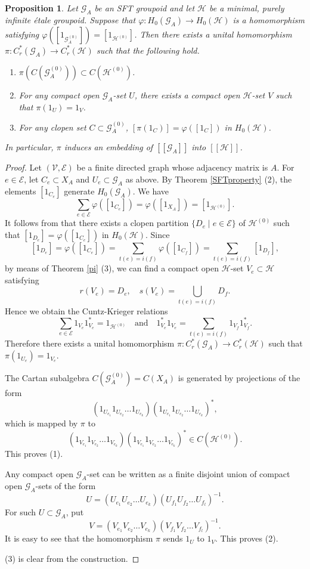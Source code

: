 \documentclass[11pt]{article}
\newtheorem{proposition}[theorem]{Proposition}
\theoremstyle{definition}
\numberwithin{equation}{section}
\renewcommand{\phi}{\varphi}
\newcommand{\G}{\mathcal{G}}
\renewcommand{\H}{\mathcal{H}}
\begin{document}
\begin{proposition}
Let $\G_A$ be an SFT groupoid and 
let $\H$ be a minimal, purely infinite \'etale groupoid. 
Suppose that $\phi:H_0(\G_A)\to H_0(\H)$ is a homomorphism 
satisfying $\phi([1_{\G_A^{(0)}}])=[1_{\H^{(0)}}]$. 
Then there exists a unital homomorphism 
$\pi:C^*_r(\G_A)\to C^*_r(\H)$ such that the following hold. 
\begin{enumerate}
\item $\pi(C(\G_A^{(0)}))\subset C(\H^{(0)})$. 
\item For any compact open $\G_A$-set $U$, 
there exists a compact open $\H$-set $V$ 
such that $\pi(1_U)=1_V$. 
\item For any clopen set $C\subset\G_A^{(0)}$, 
$[\pi(1_C)]=\phi([1_C])$ in $H_0(\H)$. 
\end{enumerate}
In particular, 
$\pi$ induces an embedding of $[[\G_A]]$ into $[[\H]]$. 
\end{proposition}
\begin{proof}
Let $(\mathcal{V},\mathcal{E})$ be a finite directed graph 
whose adjacency matrix is $A$. 
For $e\in\mathcal{E}$, 
let $C_e\subset X_A$ and $U_e\subset\G_A$ as above. 
By Theorem \ref{SFTproperty} (2), 
the elements $[1_{C_e}]$ generate $H_0(\G_A)$. 
We have 
\[
\sum_{e\in\mathcal{E}}\phi([1_{C_e}])=\phi([1_{X_A}])
=[1_{\H^{(0)}}]. 
\]
It follows from \cite[Lemma 5.3]{M15crelle} that 
there exists a clopen partition 
$\{D_e\mid e\in\mathcal{E}\}$ of $\H^{(0)}$ 
such that $[1_{D_e}]=\phi([1_{C_e}])$ in $H_0(\H)$. 
Since 
\[
[1_{D_e}]=\phi([1_{C_e}])=\sum_{t(e)=i(f)}\phi([1_{C_f}])
=\sum_{t(e)=i(f)}[1_{D_f}], 
\]
by means of Theorem \ref{pi} (3), 
we can find a compact open $\H$-set $V_e\subset\H$ satisfying 
\[
r(V_e)=D_e,\quad s(V_e)=\bigcup_{t(e)=i(f)}D_f. 
\]
Hence we obtain the Cuntz-Krieger relations 
\[
\sum_{e\in\mathcal{E}}1_{V_e}1_{V_e}^*=1_{\H^{(0)}}\quad\text{and}\quad 
1_{V_e}^*1_{V_e}=\sum_{t(e)=i(f)}1_{V_f}1_{V_f}^*. 
\]
Therefore 
there exists a unital homomorphism $\pi:C^*_r(\G_A)\to C^*_r(\H)$ 
such that $\pi(1_{U_e})=1_{V_e}$. 

The Cartan subalgebra $C(\G_A^{(0)})=C(X_A)$ is generated 
by projections of the form 
\[
(1_{U_{e_1}}1_{U_{e_2}}\dots1_{U_{e_k}})
(1_{U_{e_1}}1_{U_{e_2}}\dots1_{U_{e_k}})^*, 
\]
which is mapped by $\pi$ to 
\[
(1_{V_{e_1}}1_{V_{e_2}}\dots1_{V_{e_k}})
(1_{V_{e_1}}1_{V_{e_2}}\dots1_{V_{e_k}})^*\in C(\H^{(0)}). 
\]
This proves (1). 

Any compact open $\G_A$-set can be written as a finite disjoint union 
of compact open $\G_A$-sets of the form 
\[
U=(U_{e_1}U_{e_2}\dots U_{e_k})(U_{f_1}U_{f_2}\dots U_{f_l})^{-1}. 
\]
For such $U\subset\G_A$, put 
\[
V=(V_{e_1}V_{e_2}\dots V_{e_k})(V_{f_1}V_{f_2}\dots V_{f_l})^{-1}. 
\]
It is easy to see that the homomorphism $\pi$ sends $1_U$ to $1_V$. 
This proves (2). 

(3) is clear from the construction. 
\end{proof}
\end{document}
